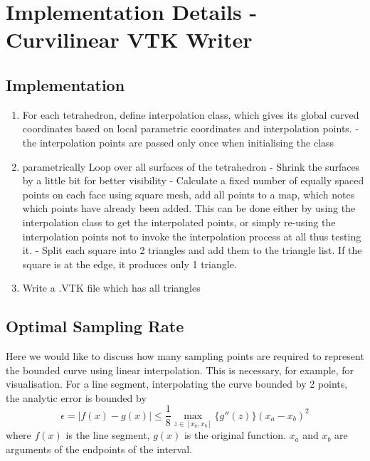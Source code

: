 \section{Implementation Details - Curvilinear VTK Writer}

\subsection{Implementation}

\begin{enumerate}
  \item For each tetrahedron, define interpolation class, which gives its global curved coordinates based on local parametric coordinates and interpolation points.
      \subitem - the interpolation points are passed only once when initialising the class
  \item parametrically Loop over all surfaces of the tetrahedron
      \subitem - Shrink the surfaces by a little bit for better visibility
      \subitem - Calculate a fixed number of equally spaced points on each face using square mesh, add all points to a map, which notes which points have already been added. This can be done either by using the interpolation class to get the interpolated points, or simply re-using the interpolation points not to invoke the interpolation process at all thus testing it.
      \subitem - Split each square into 2 triangles and add them to the triangle list. If the square is at the edge, it produces only 1 triangle.
  \item Write a .VTK file which has all triangles
\end{enumerate}


\subsection{Optimal Sampling Rate}

Here we would like to discuss how many sampling points are required to represent the bounded curve using linear interpolation. This is necessary, for example, for visualisation. For a line segment, interpolating the curve bounded by 2 points, the analytic error is bounded by
\begin{equation}
	\epsilon = |f(x) - g(x)| \leq \frac{1}{8} \max_{z \in [x_a, x_b]} \{ g''(z)  \} (x_a - x_b)^2
\end{equation}
\noindent
where $f(x)$ is the line segment, $g(x)$ is the original function. $x_a$ and $x_b$ are arguments of the endpoints of the interval. \\

